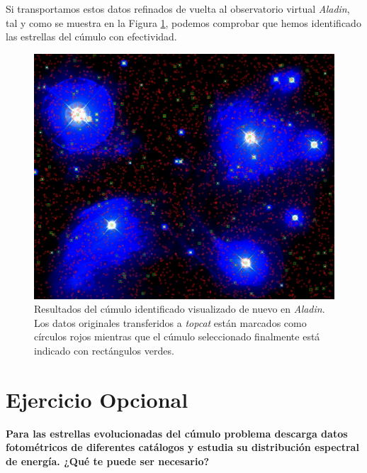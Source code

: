 \documentclass[a4paper,fleqn,usenatbib]{mnras}
\begin{document}
Si transportamos estos datos refinados de vuelta al observatorio virtual \emph{Aladin}, tal y como se muestra en la Figura \ref{fig:e2_final_m45}, podemos comprobar que hemos identificado las estrellas del cúmulo con efectividad.

\begin{figure}
  \includegraphics[width=\linewidth]{img/m45_cumulo_def}
  \caption{Resultados del cúmulo identificado visualizado de nuevo en \emph{Aladin}. Los datos originales transferidos a \emph{topcat} están marcados como círculos rojos mientras que el cúmulo seleccionado finalmente está indicado con rectángulos verdes.}
  \label{fig:e2_final_m45}
\end{figure}

\section{Ejercicio Opcional}

\textbf{Para las estrellas evolucionadas del cúmulo problema descarga datos fotométricos de diferentes catálogos y
estudia su distribución espectral de energía. ¿Qué te puede ser necesario?}













\bsp	%
\label{lastpage}
\end{document}
